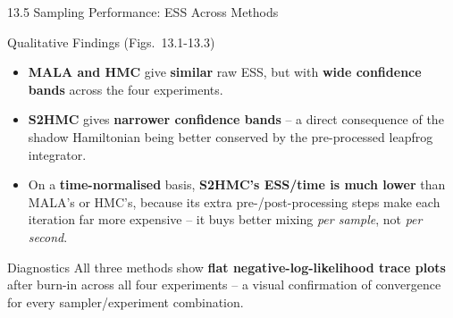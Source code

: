 \documentclass[aspectratio=169,10pt]{beamer}
\begin{document}
\begin{frame}{13.5 \; Sampling Performance: ESS Across Methods}
  \begin{block}{Qualitative Findings (Figs.~13.1-13.3)}
    \begin{itemize}
      \item \textbf{MALA and HMC} give \textbf{similar} raw ESS, but with
            \textbf{wide confidence bands} across the four experiments.
      \item \textbf{S2HMC} gives \textbf{narrower confidence bands} -- a
            direct consequence of the shadow Hamiltonian being better
            conserved by the pre-processed leapfrog integrator.
      \item On a \textbf{time-normalised} basis, \textbf{S2HMC's ESS/time is
            much lower} than MALA's or HMC's, because its extra
            pre-/post-processing steps make each iteration far more
            expensive -- it buys better mixing \emph{per sample}, not
            \emph{per second}.
    \end{itemize}
  \end{block}
  \begin{block}{Diagnostics}
    All three methods show \textbf{flat negative-log-likelihood trace
    plots} after burn-in across all four experiments -- a visual confirmation
    of convergence for every sampler/experiment combination.
  \end{block}
\end{frame}
\end{document}
